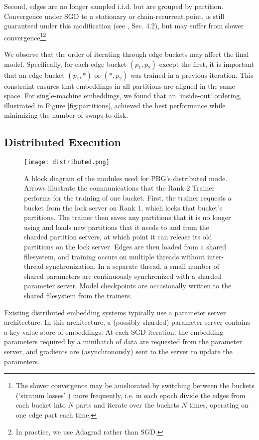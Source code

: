 \documentclass{article}
\begin{document}
Second, edges are no longer sampled i.i.d. but are grouped by partition. Convergence under SGD to a stationary or chain-recurrent point, is still guaranteed under this modification (see \cite{Gemulla:2011:LMF:2020408.2020426}, Sec. 4.2), but may suffer from slower convergence\footnote{The slower convergence may be ameliorated by switching between the buckets (`stratum losses' \cite{Gemulla:2011:LMF:2020408.2020426}) more frequently, i.e. in each epoch divide the edges from each bucket into $N$ parts and iterate over the buckets $N$ times, operating on one edge part each time.}\footnote{In practice, we use Adagrad rather than SGD.}.


We observe that the order of iterating through edge buckets may affect the final model. Specifically, for each edge bucket $(p_1,p_2)$ except the first, it is important that an edge bucket $(p_1, *)$ or $(*, p_2)$ was trained in a previous iteration. This constraint ensures that embeddings in all partitions are aligned in the same space. For single-machine embeddings, we found that an `inside-out` ordering, illustrated in Figure \ref{fig:partitions}, achieved the best performance while minimizing the number of swaps to disk. 

\subsection{Distributed Execution}

\begin{figure*}[t]
\centering
\texttt{[image: distributed.png]}
\caption{A block diagram of the modules used for PBG's distributed mode. Arrows illustrate the communications that the Rank 2 Trainer performs for the training of one bucket. First, the trainer requests a bucket from the lock server on Rank 1, which locks that bucket's partitions. The trainer then saves any partitions that it is no longer using and loads new partitions that it needs to and from the sharded partition servers, at which point it can release its old partitions on the lock server. Edges are then loaded from a shared filesystem, and training occurs on multiple threads without inter-thread synchronization\cite{hogwild}. In a separate thread, a small number of shared parameters are continuously synchronized with a sharded parameter server. Model checkpoints are occasionally written to the shared filesystem from the trainers.}
\label{fig:distributed}
\end{figure*}

Existing distributed embedding systems typically use a parameter server architecture. In this architecture, a (possibly sharded) parameter server contains a key-value store of embeddings. At each SGD iteration, the embedding parameters required by a minibatch of data are requested from the parameter server, and gradients are (asynchronously) sent to the server to update the parameters. 
\end{document}
